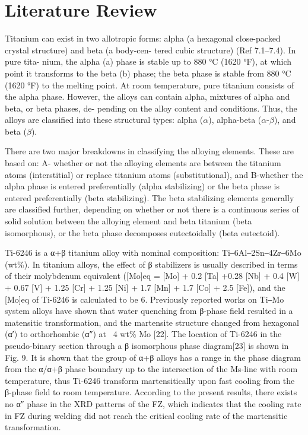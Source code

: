\chapter{Literature Review}
Titanium can exist in two allotropic forms: alpha (a hexagonal close-packed crystal structure) and beta (a body-cen- tered cubic structure) (Ref 7.1–7.4). In pure tita- nium, the alpha (a) phase is stable up to 880 °C (1620 °F), at which point it transforms to the beta (b) phase; the beta phase is stable from 880 °C (1620 °F) to the melting point. At room temperature, pure titanium consists of the alpha phase. However, the alloys can contain alpha, mixtures of alpha and beta, or beta phases, de- pending on the alloy content and conditions. Thus, the alloys are classified into these structural types: alpha ($\alpha$), alpha-beta ($\alpha$-$\beta$), and beta ($\beta$).


There are two major breakdowns in classifying the alloying elements. These are based on: A- whether or not the alloying elements are between the titanium atoms (interstitial) or replace titanium atoms (substitutional), and B-whether the alpha phase is entered preferentially (alpha stabilizing) or the beta phase is entered preferentially (beta stabilizing). The beta stabilizing elements generally are classified further, depending on whether or not there is a continuous series of solid solution between the alloying element and beta titanium (beta isomorphous), or the beta phase decomposes eutectoidally (beta eutectoid).


Ti-6246 is a α+β titanium alloy with nominal composition: Ti‒6Al‒2Sn‒4Zr‒6Mo (wt\%). In titanium alloys, the effect of β stabilizers is usually described in terms of their molybdenum equivalent ([Mo]eq = [Mo] + 0.2 [Ta] +0.28 [Nb] + 0.4 [W] + 0.67 [V] + 1.25 [Cr] + 1.25 [Ni] + 1.7 [Mn] + 1.7 [Co] + 2.5 [Fe]), and the [Mo]eq of Ti-6246 is calculated to be 6. Previously reported works on Ti‒Mo system alloys have shown that water quenching from β-phase field resulted in a matensitic transformation, and the martensite structure changed from hexagonal (α′) to orthorhombic (α″) at ~4 wt\% Mo [22]. The location of Ti-6246 in the pseudo-binary section through
a β isomorphous phase diagram[23] is shown in Fig. 9. It is shown that the group of α+β alloys has a
range in the phase diagram from the α/α+β phase boundary up to the intersection of the Ms-line
with room temperature, thus Ti-6246 transform martensitically upon fast cooling from the β-phase
field to room temperature. According to the present results, there exists no α″ phase in the XRD
patterns of the FZ, which indicates that the cooling rate in FZ during welding did not reach the
critical cooling rate of the martensitic transformation.


